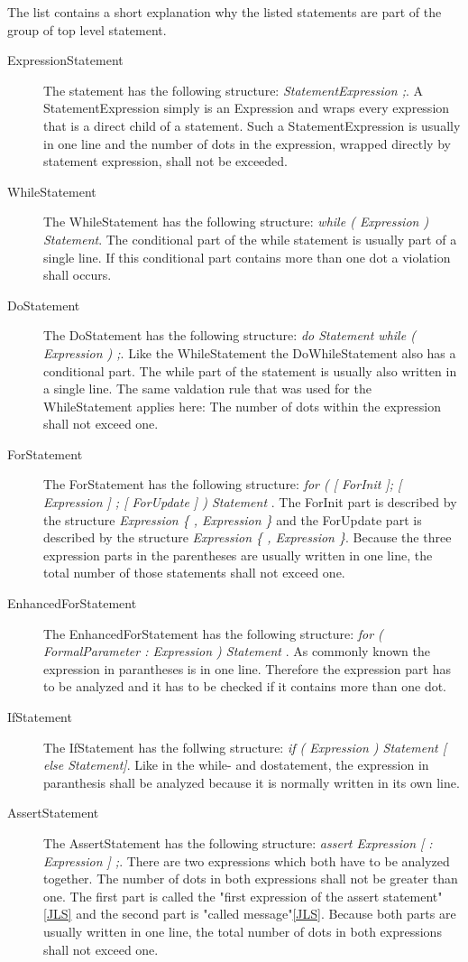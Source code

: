 The list contains a short explanation why the listed statements are part of the group of top level statement.
\\

\begin{description}
  \item[ExpressionStatement] The statement has the following structure: \textit{ StatementExpression ;}. A StatementExpression simply is an Expression and wraps every expression that is a direct child of a statement. Such a StatementExpression is usually in one line and the number of dots in the expression, wrapped directly by statement expression, shall not be exceeded.
  \item[WhileStatement] The WhileStatement  has the following structure: \textit{while ( Expression ) Statement}. The conditional part of the while statement is usually part of a single line. If this conditional part contains more than one dot a violation shall occurs.
  \item[DoStatement] The DoStatement has the following structure: \textit{do Statement while ( Expression ) ;}. Like the WhileStatement the DoWhileStatement also has a conditional part. The while part of the statement is usually also written in a single line. The same valdation rule that was used for the WhileStatement applies here: The number of dots within the expression shall not exceed one.
  \item[ForStatement] The ForStatement has the following structure: \textit{for ( [ ForInit ]; [ Expression ] ; [ ForUpdate ] ) Statement  
  }. The ForInit part is described by the structure \textit{Expression \{ , Expression \}} and the ForUpdate  part is described by the structure \textit{ Expression \{ , Expression \}}. Because the three expression parts in the parentheses are usually written in one line, the total number of those statements shall not exceed one. 
  \item[EnhancedForStatement] The EnhancedForStatement has the following structure: \textit{for ( FormalParameter : Expression ) Statement }. As commonly known the expression in parantheses is in one line. Therefore the expression part has to be analyzed and it has to be checked if it contains more than one dot.
  \item[IfStatement] The IfStatement has the follwing structure: \textit{if ( Expression ) Statement [ else Statement]}. Like in the while- and dostatement, the expression in paranthesis shall be analyzed because it is normally written in its own line. 
  \item[AssertStatement] The AssertStatement  has the following structure: \textit{assert Expression [ : Expression ] ;}. There are two expressions which both have to be analyzed together. The number of dots in both expressions shall not be greater than one. The first part is called the "first expression of the assert statement"\ref{JLS} and the second part is "called message"\ref{JLS}. Because both parts are usually written in one line, the total number of dots in both expressions shall not exceed one.

\end{description}
